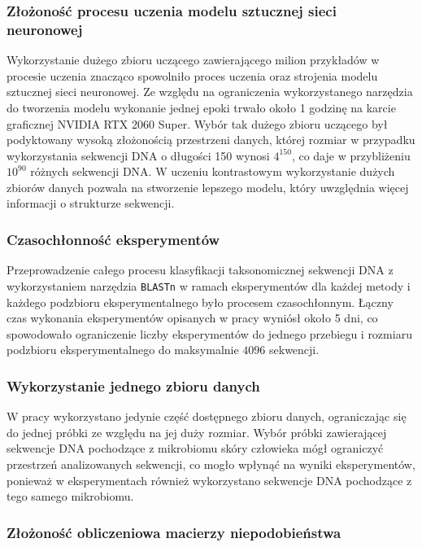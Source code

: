         \subsubsection{Złożoność procesu uczenia modelu sztucznej sieci neuronowej}

            Wykorzystanie dużego zbioru uczącego zawierającego milion przykładów w procesie uczenia znacząco spowolniło proces uczenia oraz strojenia modelu sztucznej sieci neuronowej. Ze względu na ograniczenia wykorzystanego narzędzia do tworzenia modelu wykonanie jednej epoki trwało około 1 godzinę na karcie graficznej NVIDIA RTX 2060 Super. Wybór tak dużego zbioru uczącego był podyktowany wysoką złożonością przestrzeni danych, której rozmiar w przypadku wykorzystania sekwencji DNA o długości 150 wynosi $4^{150}$, co daje w przybliżeniu $10^{90}$ różnych sekwencji DNA. W uczeniu kontrastowym wykorzystanie dużych zbiorów danych pozwala na stworzenie lepszego modelu, który uwzględnia więcej informacji o strukturze sekwencji.

        \subsubsection{Czasochłonność eksperymentów}

            Przeprowadzenie całego procesu klasyfikacji taksonomicznej sekwencji DNA z wykorzystaniem narzędzia \texttt{BLASTn} w ramach eksperymentów dla każdej metody i każdego podzbioru eksperymentalnego było procesem czasochłonnym. Łączny czas wykonania eksperymentów opisanych w pracy wyniósł około 5 dni, co spowodowało ograniczenie liczby eksperymentów do jednego przebiegu i rozmiaru podzbioru eksperymentalnego do maksymalnie $4096$ sekwencji.

        \subsubsection{Wykorzystanie jednego zbioru danych}

            W pracy wykorzystano jedynie część dostępnego zbioru danych, ograniczając się do jednej próbki ze względu na jej duży rozmiar. Wybór próbki zawierającej sekwencje DNA pochodzące z mikrobiomu skóry człowieka mógł ograniczyć przestrzeń analizowanych sekwencji, co mogło wpłynąć na wyniki eksperymentów, ponieważ w eksperymentach również wykorzystano sekwencje DNA pochodzące z tego samego mikrobiomu.

        \subsubsection{Złożoność obliczeniowa macierzy niepodobieństwa}

